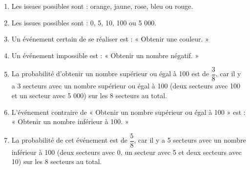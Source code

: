 \begin{corrige}
    \begin{enumerate}
      \item Les issues possibles sont : orange, jaune, rose, bleu ou rouge.
      \item Les issues possibles sont : 0, 5, 10, 100 ou 5 000.
      \item Un événement certain de se réaliser est : « Obtenir une couleur. »
      \item Un événement impossible est : « Obtenir un nombre négatif. »
      \item La probabilité d'obtenir un nombre supérieur ou égal à 100 est de $\dfrac{3}{8}$, car il y a 3 secteurs avec un nombre supérieur ou égal à 100 (deux secteurs avec 100 et un secteur avec 5 000) sur les 8 secteurs au total.
      \item L'événement contraire de « Obtenir un nombre supérieur ou égal à 100 » est : « Obtenir un nombre inférieur à 100. »
      \item La probabilité de cet événement est de $\dfrac{5}{8}$, car il y a 5 secteurs avec un nombre inférieur à 100 (deux secteurs avec 0, un secteur avec 5 et deux secteurs avec 10) sur les 8 secteurs au total.
    \end{enumerate}
\end{corrige}

